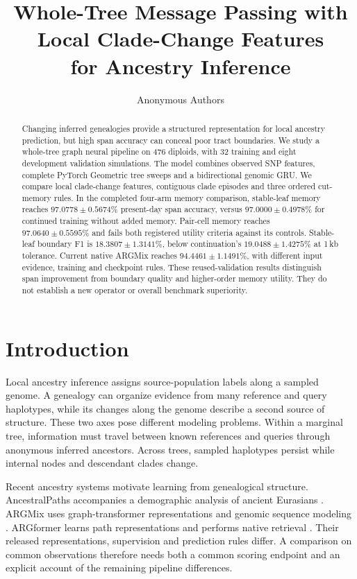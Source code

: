 \documentclass[letterpaper]{article}
\title{Whole-Tree Message Passing with Local Clade-Change Features\\
for Ancestry Inference}
\author{Anonymous Authors}
\begin{document}
\maketitle
\begin{abstract}
Changing inferred genealogies provide a structured representation for local ancestry prediction, but high span accuracy can conceal poor tract boundaries. We study a whole-tree graph neural pipeline on 476 diploids, with 32 training and eight development validation simulations. The model combines observed SNP features, complete PyTorch Geometric tree sweeps and a bidirectional genomic GRU. We compare local clade-change features, contiguous clade episodes and three ordered cut-memory rules. In the completed four-arm memory comparison, stable-leaf memory reaches $97.0778\pm0.5674\%$ present-day span accuracy, versus $97.0000\pm0.4978\%$ for continued training without added memory. Pair-cell memory reaches $97.0640\pm0.5595\%$ and fails both registered utility criteria against its controls. Stable-leaf boundary F1 is $18.3807\pm1.3141\%$, below continuation's $19.0488\pm1.4275\%$ at 1\,kb tolerance. Current native ARGMix reaches $94.4461\pm1.1491\%$, with different input evidence, training and checkpoint rules. These reused-validation results distinguish span improvement from boundary quality and higher-order memory utility. They do not establish a new operator or overall benchmark superiority.
\end{abstract}

\section{Introduction}
Local ancestry inference assigns source-population labels along a sampled genome. A genealogy can organize evidence from many reference and query haplotypes, while its changes along the genome describe a second source of structure. These two axes pose different modeling problems. Within a marginal tree, information must travel between known references and queries through anonymous inferred ancestors. Across trees, sampled haplotypes persist while internal nodes and descendant clades change.

Recent ancestry systems motivate learning from genealogical structure. AncestralPaths accompanies a demographic analysis of ancient Eurasians \citep{eurasians2024}. ARGMix uses graph-transformer representations and genomic sequence modeling \citep{ancientancestry2026}. ARGformer learns path representations and performs native retrieval \citep{argformer2026}. Their released representations, supervision and prediction rules differ. A comparison on common observations therefore needs both a common scoring endpoint and an explicit account of the remaining pipeline differences.
\end{document}
